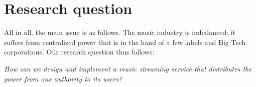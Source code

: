 \section{Research question}
All in all, the main issue is as follows. The music industry is imbalanced: it suffers from centralized power that is in the hand of a few labels and Big Tech corporations. Our research question thus follows:

\textit{How can we design and implement a music streaming service that distributes the power from one authority to its users?}
